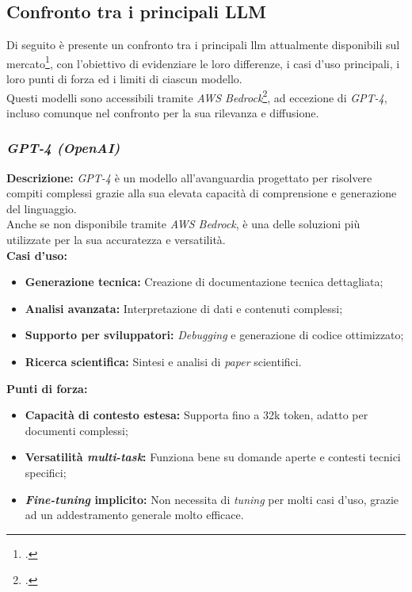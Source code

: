 \subsection{Confronto tra i principali LLM}
\label{subsec:llm-confronto}

Di seguito è presente un confronto tra i principali \gls{llm} attualmente disponibili sul mercato\footcite{site:key-differences-llm}, con l'obiettivo di evidenziare le loro differenze, i casi d'uso principali, i loro punti di forza ed i limiti di ciascun modello.\\
Questi modelli sono accessibili tramite \textit{AWS Bedrock}\footcite{site:aws-bedrock}, ad eccezione di \textit{GPT-4}, incluso comunque nel confronto per la sua rilevanza e diffusione.

\subsubsection{\textit{GPT-4 (OpenAI)}}

\noindent \textbf{Descrizione:}
\textit{GPT-4} è un modello all’avanguardia progettato per risolvere compiti complessi grazie alla sua elevata capacità di comprensione e generazione del linguaggio. \\
Anche se non disponibile tramite \textit{AWS Bedrock}, è una delle soluzioni più utilizzate per la sua accuratezza e versatilità.\\

\noindent \textbf{Casi d’uso:}
\begin{itemize}
   \item \textbf{Generazione tecnica:} Creazione di documentazione tecnica dettagliata;
   \item \textbf{Analisi avanzata:} Interpretazione di dati e contenuti complessi;
   \item \textbf{Supporto per sviluppatori:} \textit{Debugging} e generazione di codice ottimizzato;
   \item \textbf{Ricerca scientifica:} Sintesi e analisi di \textit{paper} scientifici.
\end{itemize}

\noindent \textbf{Punti di forza:}
\begin{itemize}
    \item \textbf{Capacità di contesto estesa:} Supporta fino a 32k \gls{token}, adatto per documenti complessi;
    \item \textbf{Versatilità \textit{multi-task}:} Funziona bene su domande aperte e contesti tecnici specifici;
    \item \textbf{\textit{Fine-tuning} implicito:} Non necessita di \textit{tuning} per molti casi d’uso, grazie ad un addestramento generale molto efficace.
\end{itemize}

